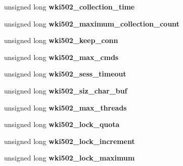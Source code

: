 \begin{DoxyCompactItemize}
unsigned long {\bfseries wki502\+\_\+collection\+\_\+time}
\item 
\mbox{\label{struct___w_k_s_t_a___i_n_f_o__502_aa6fdb028d6a6e080ca0b8ec9440ceca6}} 
unsigned long {\bfseries wki502\+\_\+maximum\+\_\+collection\+\_\+count}
\item 
\mbox{\label{struct___w_k_s_t_a___i_n_f_o__502_a1822e103b93b1be9afa050b9f8b6c4e1}} 
unsigned long {\bfseries wki502\+\_\+keep\+\_\+conn}
\item 
\mbox{\label{struct___w_k_s_t_a___i_n_f_o__502_a7f7c1487d78529fa3886146213a9a767}} 
unsigned long {\bfseries wki502\+\_\+max\+\_\+cmds}
\item 
\mbox{\label{struct___w_k_s_t_a___i_n_f_o__502_aba95a7775cc31939b5804e95f49deeb7}} 
unsigned long {\bfseries wki502\+\_\+sess\+\_\+timeout}
\item 
\mbox{\label{struct___w_k_s_t_a___i_n_f_o__502_abdb4229f05d7f55271d19d85a5e0afe8}} 
unsigned long {\bfseries wki502\+\_\+siz\+\_\+char\+\_\+buf}
\item 
\mbox{\label{struct___w_k_s_t_a___i_n_f_o__502_aa8e6c034d7c920654bdcde103b574f72}} 
unsigned long {\bfseries wki502\+\_\+max\+\_\+threads}
\item 
\mbox{\label{struct___w_k_s_t_a___i_n_f_o__502_a10e43149872cd4eaa4b47ea8b1382375}} 
unsigned long {\bfseries wki502\+\_\+lock\+\_\+quota}
\item 
\mbox{\label{struct___w_k_s_t_a___i_n_f_o__502_a77035dcf70e647d4fef271c4ef94311f}} 
unsigned long {\bfseries wki502\+\_\+lock\+\_\+increment}
\item 
\mbox{\label{struct___w_k_s_t_a___i_n_f_o__502_ad221440557a7433f5bafb21e9b77764c}} 
unsigned long {\bfseries wki502\+\_\+lock\+\_\+maximum}
\item 
\mbox{\label{struct___w_k_s_t_a___i_n_f_o__502_a32940304a86d52437e1e8fbd4349881a}} 

\end{DoxyCompactItemize}
